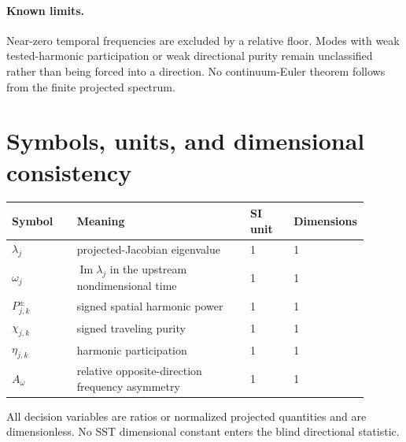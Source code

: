 \documentclass[11pt,a4paper]{article}
\begin{document}
\paragraph{Known limits.}
Near-zero temporal frequencies are excluded by a relative floor. Modes with weak tested-harmonic participation or weak directional purity remain unclassified rather than being forced into a direction. No continuum-Euler theorem follows from the finite projected spectrum.

\section{Symbols, units, and dimensional consistency}
\begin{longtable}{p{0.18\linewidth}p{0.48\linewidth}p{0.12\linewidth}p{0.12\linewidth}}
\toprule Symbol & Meaning & SI unit & Dimensions \\
\midrule
$\lambda_j$ & projected-Jacobian eigenvalue & 1 & 1 \\
$\omega_j$ & $\operatorname{Im}\lambda_j$ in the upstream nondimensional time & 1 & 1 \\
$P_{j,k}^{\pm}$ & signed spatial harmonic power & 1 & 1 \\
$\chi_{j,k}$ & signed traveling purity & 1 & 1 \\
$\eta_{j,k}$ & harmonic participation & 1 & 1 \\
$A_\omega$ & relative opposite-direction frequency asymmetry & 1 & 1 \\
\bottomrule
\end{longtable}
All decision variables are ratios or normalized projected quantities and are dimensionless. No SST dimensional constant enters the blind directional statistic.

\end{document}
